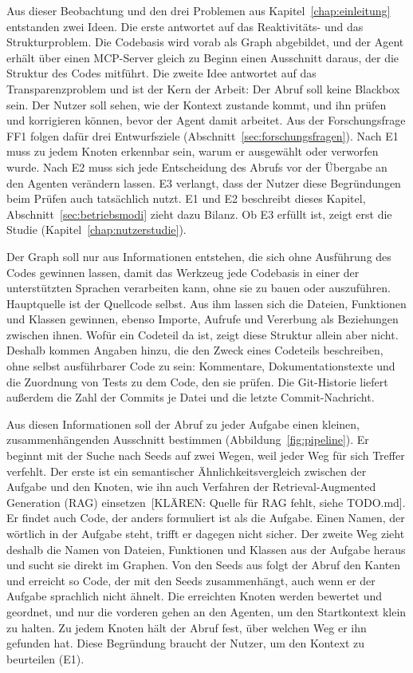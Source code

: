 Aus dieser Beobachtung und den drei Problemen aus Kapitel~\ref{chap:einleitung} entstanden zwei Ideen. Die erste antwortet auf das Reaktivitäts- und das Strukturproblem. Die Codebasis wird vorab als Graph abgebildet, und der Agent erhält über einen MCP-Server gleich zu Beginn einen Ausschnitt daraus, der die Struktur des Codes mitführt. Die zweite Idee antwortet auf das Transparenzproblem und ist der Kern der Arbeit: Der Abruf soll keine Blackbox sein. Der Nutzer soll sehen, wie der Kontext zustande kommt, und ihn prüfen und korrigieren können, bevor der Agent damit arbeitet. Aus der Forschungsfrage FF1 folgen dafür drei Entwurfsziele (Abschnitt~\ref{sec:forschungsfragen}). Nach E1 muss zu jedem Knoten erkennbar sein, warum er ausgewählt oder verworfen wurde. Nach E2 muss sich jede Entscheidung des Abrufs vor der Übergabe an den Agenten verändern lassen. E3 verlangt, dass der Nutzer diese Begründungen beim Prüfen auch tatsächlich nutzt. E1 und E2 beschreibt dieses Kapitel, Abschnitt~\ref{sec:betriebsmodi} zieht dazu Bilanz. Ob E3 erfüllt ist, zeigt erst die Studie (Kapitel~\ref{chap:nutzerstudie}).

Der Graph soll nur aus Informationen entstehen, die sich ohne Ausführung des Codes gewinnen lassen, damit das Werkzeug jede Codebasis in einer der unterstützten Sprachen verarbeiten kann, ohne sie zu bauen oder auszuführen. Hauptquelle ist der Quellcode selbst. Aus ihm lassen sich die Dateien, Funktionen und Klassen gewinnen, ebenso Importe, Aufrufe und Vererbung als Beziehungen zwischen ihnen. Wofür ein Codeteil da ist, zeigt diese Struktur allein aber nicht. Deshalb kommen Angaben hinzu, die den Zweck eines Codeteils beschreiben, ohne selbst ausführbarer Code zu sein: Kommentare, Dokumentationstexte und die Zuordnung von Tests zu dem Code, den sie prüfen. Die Git-Historie liefert außerdem die Zahl der Commits je Datei und die letzte Commit-Nachricht.

Aus diesen Informationen soll der Abruf zu jeder Aufgabe einen kleinen, zusammenhängenden Ausschnitt bestimmen (Abbildung~\ref{fig:pipeline}). Er beginnt mit der Suche nach Seeds auf zwei Wegen, weil jeder Weg für sich Treffer verfehlt. Der erste ist ein semantischer Ähnlichkeitsvergleich zwischen der Aufgabe und den Knoten, wie ihn auch Verfahren der Retrieval-Augmented Generation (RAG) einsetzen~[KLÄREN: Quelle für RAG fehlt, siehe TODO.md]. Er findet auch Code, der anders formuliert ist als die Aufgabe. Einen Namen, der wörtlich in der Aufgabe steht, trifft er dagegen nicht sicher. Der zweite Weg zieht deshalb die Namen von Dateien, Funktionen und Klassen aus der Aufgabe heraus und sucht sie direkt im Graphen. Von den Seeds aus folgt der Abruf den Kanten und erreicht so Code, der mit den Seeds zusammenhängt, auch wenn er der Aufgabe sprachlich nicht ähnelt. Die erreichten Knoten werden bewertet und geordnet, und nur die vorderen gehen an den Agenten, um den Startkontext klein zu halten. Zu jedem Knoten hält der Abruf fest, über welchen Weg er ihn gefunden hat. Diese Begründung braucht der Nutzer, um den Kontext zu beurteilen (E1).

